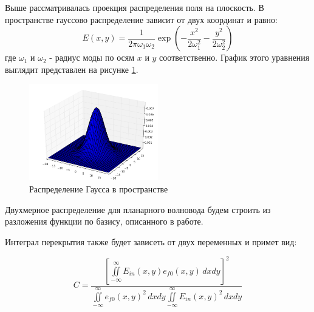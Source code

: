 Выше рассматривалась проекция распределения поля на плоскость. В пространстве гауссово распределение зависит от двух координат и равно:
\begin{equation}
  \label{gauss3d}
  E(x,y)=\frac{1}{2\pi\omega_1\omega_2}\exp\left(-\frac{x^2}{2\omega_1^2}-\frac{y^2}{2\omega_2^2}\right)
\end{equation}
где $\omega_1$ и $\omega_2$ - радиус моды по осям $x$ и $y$ соответственно. График этого уравнения выглядит представлен на рисунке \ref{gauss3dPlot}.
\begin{figure}[h!]
	\includegraphics[width=0.5\textwidth]{img/gauss3d.png}
	\caption{Распределение Гаусса в пространстве}
	\label{gauss3dPlot}
\end{figure}

Двухмерное распределение для планарного волновода будем строить из разложения функции по базису, описанного в работе\cite{vlada}.

Интеграл перекрытия также будет зависеть от двух переменных и примет вид:

\begin{equation}
	\label{coupling_2d}
	C = \frac{\left[\iint\limits_{-\infty}^{\infty}E_{in}(x,y)e_{f0}(x,y) \,dxdy\right]^2}
	{\iint\limits_{-\infty}^{\infty}e_{f0}(x,y)^2 \,dxdy
	 \iint\limits_{-\infty}^{\infty}E_{in}(x,y)^2 \,dxdy}
\end{equation}
